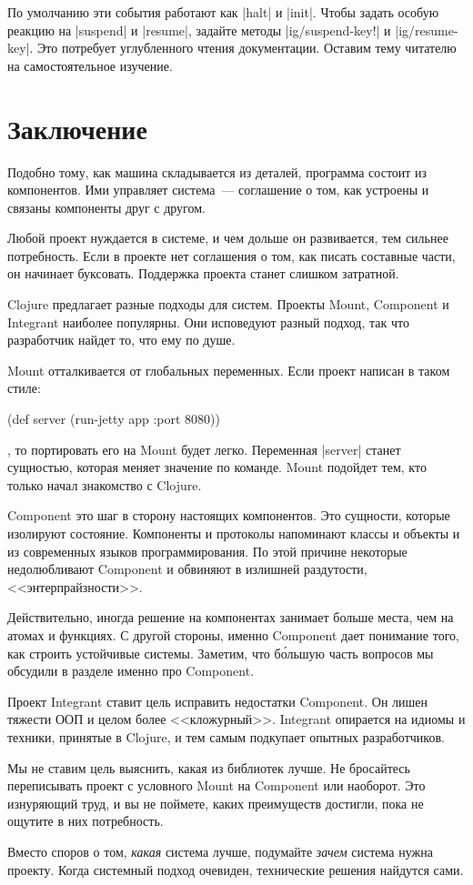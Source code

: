 По умолчанию эти события работают как \spverb|halt| и \spverb|init|. Чтобы
задать особую реакцию на \spverb|suspend| и \spverb|resume|, задайте методы
\spverb|ig/suspend-key!| и \spverb|ig/resume-key|. Это потребует углубленного
чтения документации. Оставим тему читателю на самостоятельное изучение.

\section{Заключение}

Подобно тому, как машина складывается из деталей, программа состоит из
компонентов. Ими управляет система~--- соглашение о том, как устроены и связаны
компоненты друг с другом.

Любой проект нуждается в системе, и чем дольше он развивается, тем сильнее
потребность. Если в проекте нет соглашения о том, как писать составные части, он
начинает буксовать. Поддержка проекта станет слишком затратной.

Clojure предлагает разные подходы для систем. Проекты Mount, Component и
Integrant наиболее популярны. Они исповедуют разный подход, так что разработчик
найдет то, что ему по душе.

Mount отталкивается от глобальных переменных. Если проект написан в таком стиле:

\begin{english}
  \begin{clojure}
(def server (run-jetty app {:port 8080}))
  \end{clojure}
\end{english}

\noindent
, то портировать его на Mount будет легко. Переменная \spverb|server| станет
сущностью, которая меняет значение по команде. Mount подойдет тем, кто только
начал знакомство с Clojure.

Component это шаг в сторону настоящих компонентов. Это сущности, которые
изолируют состояние. Компоненты и протоколы напоминают классы и объекты и из
современных языков программирования. По этой причине некоторые недолюбливают
Component и обвиняют в излишней раздутости, <<энтерпрайзности>>.

Действительно, иногда решение на компонентах занимает больше места, чем на
атомах и функциях. С другой стороны, именно Component дает понимание того, как
строить устойчивые системы. Заметим, что б\'{о}льшую часть вопросов мы обсудили
в разделе именно про Component.

Проект Integrant ставит цель исправить недостатки Component. Он лишен тяжести
ООП и целом более <<кложурный>>. Integrant опирается на идиомы и техники,
принятые в Clojure, и тем самым подкупает опытных разработчиков.

Мы не ставим цель выяснить, какая из библиотек лучше. Не бросайтесь переписывать
проект с условного Mount на Component или наоборот. Это изнуряющий труд, и вы не
поймете, каких преимуществ достигли, пока не ощутите в них потребность.

Вместо споров о том, \emph{какая} система лучше, подумайте \emph{зачем} система
нужна проекту. Когда системный подход очевиден, технические решения найдутся
сами.
